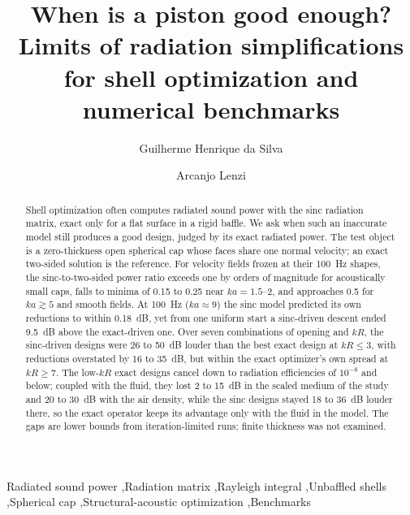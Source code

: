 \documentclass[preprint,12pt]{elsarticle}
\begin{document}
\begin{frontmatter}
\title{When is a piston good enough? Limits of radiation simplifications for shell optimization and numerical benchmarks}
\author{Guilherme Henrique da Silva}
\author{Arcanjo Lenzi}
\address{Laborat\'orio de Vibra\c{c}\~oes e Ac\'ustica, Department of Mechanical Engineering, Universidade Federal de Santa Catarina, Florian\'opolis, Brazil}
\begin{abstract}
Shell optimization often computes radiated sound power with the sinc radiation matrix, exact only for a flat surface in a rigid baffle. We ask when such an inaccurate model still produces a good design, judged by its exact radiated power. The test object is a zero-thickness open spherical cap whose faces share one normal velocity; an exact two-sided solution is the reference. For velocity fields frozen at their 100~Hz shapes, the sinc-to-two-sided power ratio exceeds one by orders of magnitude for acoustically small caps, falls to minima of 0.15 to 0.25 near $ka=1.5$--2, and approaches 0.5 for $ka\gtrsim5$ and smooth fields. At 100~Hz ($ka\approx9$) the sinc model predicted its own reductions to within 0.18~dB, yet from one uniform start a sinc-driven descent ended 9.5~dB above the exact-driven one. Over seven combinations of opening and $kR$, the sinc-driven designs were 26 to 50~dB louder than the best exact design at $kR\le3$, with reductions overstated by 16 to 35~dB, but within the exact optimizer's own spread at $kR\ge7$. The low-$kR$ exact designs cancel down to radiation efficiencies of $10^{-8}$ and below; coupled with the fluid, they lost 2 to 15~dB in the scaled medium of the study and 20 to 30~dB with the air density, while the sinc designs stayed 18 to 36~dB louder there, so the exact operator keeps its advantage only with the fluid in the model. The gaps are lower bounds from iteration-limited runs; finite thickness was not examined.
\end{abstract}
\begin{keyword}
Radiated sound power \sep Radiation matrix \sep Rayleigh integral \sep Unbaffled shells \sep Spherical cap \sep Structural-acoustic optimization \sep Benchmarks
\end{keyword}
\end{frontmatter}

\end{document}
